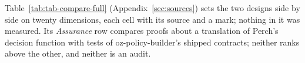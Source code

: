 Table~\ref{tab:tab-compare-full} (Appendix~\ref{sec:sources}) sets the two
designs side by side on twenty dimensions, each cell with its source and a mark;
nothing in it was measured. Its \emph{Assurance} row compares proofs about a
translation of Perch's decision function with tests of oz-policy-builder's
shipped contracts; neither ranks above the other, and neither is an audit.
